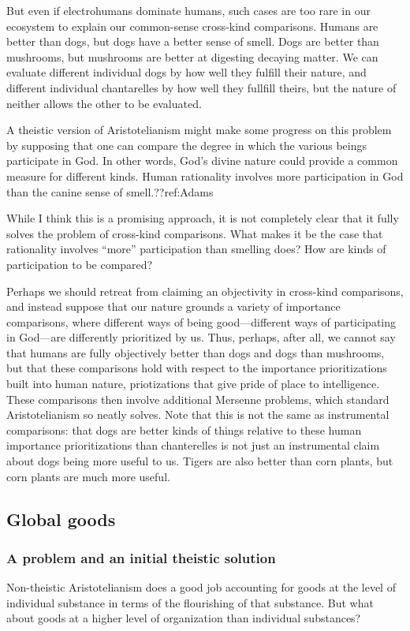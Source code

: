 But even if electrohumans dominate humans, such cases are too rare in our ecosystem to explain our common-sense 
cross-kind comparisons. Humans are better than dogs, but dogs have a better sense of smell. Dogs are better than mushrooms,
but mushrooms are better at digesting decaying matter. We can evaluate different individual dogs by how well they 
fulfill their nature, and different individual chantarelles by how well they fullfill theirs, but the nature of neither
allows the other to be evaluated.

A theistic version of Aristotelianism might make some progress on this problem by supposing that one can
compare the degree in which the various beings participate in God. In other words, God's divine nature could 
provide a common measure for different kinds. Human rationality involves more participation in God than the canine 
sense of smell.??ref:Adams

While I think this is a promising approach, it is not completely clear that it fully solves the problem of cross-kind 
comparisons. What makes it be the case that rationality involves ``more'' participation than smelling does? How are 
kinds of participation to be compared? 

Perhaps we should retreat from claiming an objectivity in cross-kind comparisons, and instead suppose that our nature 
grounds a variety of importance comparisons, where different ways of being good---different ways of participating in 
God---are differently prioritized by us. Thus, perhaps, after all, we cannot say that humans are fully objectively 
better than dogs and dogs than mushrooms, but that these comparisons hold with respect to the importance prioritizations
built into human nature, priotizations that give pride of place to intelligence. These comparisons then involve 
additional Mersenne problems, which standard Aristotelianism so neatly solves. Note that this is not the same as 
instrumental comparisons: that dogs are better kinds of things relative to these human importance prioritizations than
chanterelles is not just an instrumental claim about dogs being more useful to us. Tigers are also better than corn plants,
but corn plants are much more useful.

\subsection{Global goods}
\subsubsection{A problem and an initial theistic solution}
Non-theistic Aristotelianism does a good job accounting for goods at the level of individual substance
in terms of the flourishing of that substance. But what about goods at a higher level of
organization than individual substances?


